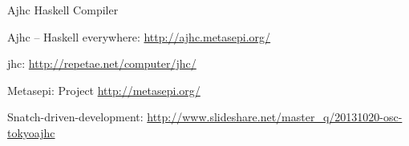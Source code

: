 \begin{hcarentry}{Ajhc Haskell Compiler}
\FurtherReading
  \begin{compactitem}
    \item Ajhc -- Haskell everywhere: \url{http://ajhc.metasepi.org/}
    \item jhc: \url{http://repetae.net/computer/jhc/}
    \item Metasepi: Project \url{http://metasepi.org/}
    \item Snatch-driven-development: \url{http://www.slideshare.net/master\_q/20131020-osc-tokyoajhc}
  \end{compactitem}
\end{hcarentry}
